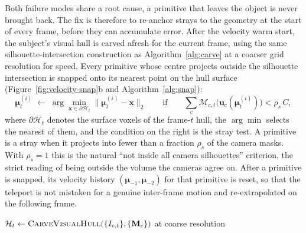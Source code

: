 Both failure modes share a root cause, a
primitive that leaves the object is never brought back. The fix is therefore to
re-anchor strays to the geometry at the start of every frame, before they can
accumulate error. After the velocity warm start, the subject's visual hull is carved
afresh for the current frame, using the same silhouette-intersection construction as
Algorithm~\ref{alg:carve} at a coarser grid resolution for speed. Every
primitive whose centre projects outside the silhouette intersection is snapped
onto its nearest point on the hull surface (Figure~\ref{fig:velocity-snap}b and
Algorithm~\ref{alg:snap}):
\begin{equation}
    \boldsymbol{\mu}^{(i)}_t \;\leftarrow\;
    \arg\min_{\mathbf{x}\in\partial\mathcal{H}_t} \big\| \boldsymbol{\mu}^{(i)}_t - \mathbf{x} \big\|_2
    \qquad \text{if} \qquad
    \textstyle\sum_{c} \mathcal{M}_{c,t}\big(\mathbf{u}_c(\boldsymbol{\mu}^{(i)}_t)\big) < \rho_s\, C ,
    \label{eq:snap}
\end{equation}
where $\partial\mathcal{H}_t$ denotes the surface voxels of the frame-$t$ hull, the
$\arg\min$ selects the nearest of them, and the condition on the right is the stray
test. A primitive is a stray when it projects into fewer than a fraction $\rho_s$ of
the camera masks. With $\rho_s = 1$ this is the natural \enquote{not inside all camera
silhouettes} criterion, the strict reading of being outside the volume the cameras
agree on. After a primitive is snapped, its velocity history $(\boldsymbol{\mu}_{-1},
\boldsymbol{\mu}_{-2})$ for that primitive is reset, so that the teleport is not
mistaken for a genuine inter-frame motion and re-extrapolated on the following frame.

\begin{algorithm}[t]
\SetAlgoLined
{}
$\mathcal{H}_t \gets \textsc{CarveVisualHull}(\{I_{c,t}\}, \{\mathbf{M}_c\})$ at coarse resolution\;
\caption{Per-frame hull snapping (\textsc{SnapStraysToHull}).}
\label{alg:snap}
\end{algorithm}

